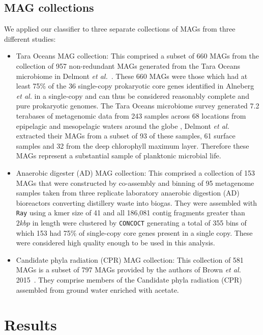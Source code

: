 \documentclass[10pt,letterpaper]{article}
\begin{document}
\subsection*{MAG collections}
We applied our classifier to three separate collections of MAGs from three different studies:
\begin{itemize}

\item Tara Oceans MAG collection: This comprised a subset of 660 MAGs from the collection 
of 957 non-redundant MAGs generated from the Tara Oceans microbiome in Delmont {\it et al.}~\cite{Delmont2017}. These 660 MAGs were those which had at least 75\% of the 36 single-copy prokaryotic core genes identified in Alneberg {\it et al.} \cite{Alneberg2014} in a single-copy and can thus be considered reasonably complete and pure prokaryotic genomes. The Tara Oceans microbiome survey generated 7.2 terabases of metagenomic data from 243 samples across 68 locations from epipelagic and mesopelagic waters around the globe \cite{Sunagawa2015}, Delmont {\it et al.} extracted their MAGs from a subset of 93 of these samples, 61 surface samples and 32 from the deep chlorophyll maximum layer. Therefore these MAGs represent a substantial sample of planktonic microbial life.

\item Anaerobic digester (AD) MAG collection: This comprised a collection of 153 MAGs that were constructed by co-assembly and binning of 95 metagenome samples taken from three 
replicate laboratory anaerobic digestion (AD) bioreactors converting distillery waste into biogas. They were assembled with \texttt{Ray} using a kmer size of 41 and all 186,081 contig fragments greater than $2 kbp$ in length were clustered by \texttt{CONCOCT} \cite{Alneberg2014} generating a total of 355 bins of which 153 had 75\% of single-copy core genes present in a single copy. These were considered high quality enough to be used in this analysis. 

\item Candidate phyla radiation (CPR) MAG collection: This collection of 581 MAGs is a subset of 797 MAGs provided by the authors of Brown \emph{et al.} 2015~\cite{Brown2015}. They comprise members 
of the Candidate phyla radiation (CPR) assembled from ground water enriched with acetate.

\end{itemize} 

\section*{Results}
\end{document}
